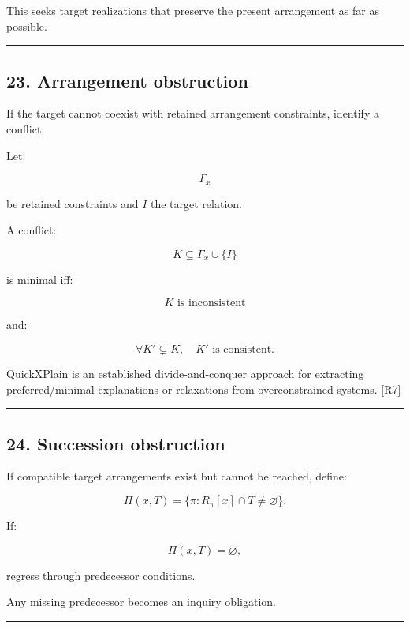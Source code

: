 \documentclass[
]{article}
\begin{document}
This seeks target realizations that preserve the present arrangement as
far as possible.

\begin{center}\rule{0.5\linewidth}{0.5pt}\end{center}

\subsection{23. Arrangement obstruction}\label{arrangement-obstruction}

If the target cannot coexist with retained arrangement constraints,
identify a conflict.

Let:

\[
\Gamma_x
\]

be retained constraints and \(I\) the target relation.

A conflict:

\[
K\subseteq\Gamma_x\cup\{I\}
\]

is minimal iff:

\[
K\text{ is inconsistent}
\]

and:

\[
\forall K'\subsetneq K,\quad
K'\text{ is consistent}.
\]

QuickXPlain is an established divide-and-conquer approach for extracting
preferred/minimal explanations or relaxations from overconstrained
systems. {[}R7{]}

\begin{center}\rule{0.5\linewidth}{0.5pt}\end{center}

\subsection{24. Succession obstruction}\label{succession-obstruction}

If compatible target arrangements exist but cannot be reached, define:

\[
\Pi(x,T)
=
\{
\pi:
R_\pi[x]\cap T\neq\varnothing
\}.
\]

If:

\[
\Pi(x,T)=\varnothing,
\]

regress through predecessor conditions.

Any missing predecessor becomes an inquiry obligation.

\begin{center}\rule{0.5\linewidth}{0.5pt}\end{center}
\end{document}
